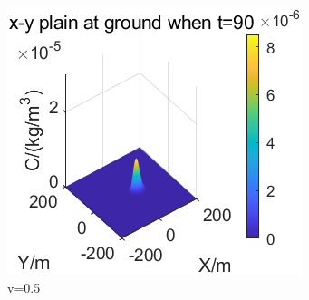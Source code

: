 \documentclass{article}
\begin{document}
\begin{figure}[htbp]
\begin{minipage}{0.33\textwidth}
		\end{minipage}
		\begin{minipage}{0.33\textwidth}
			\includegraphics[width=\textwidth]{pics/v=0.5,t=90.png}
		\end{minipage}
		\caption{v=0.5}
		\label{fig15}
	\end{figure}
\end{document}
